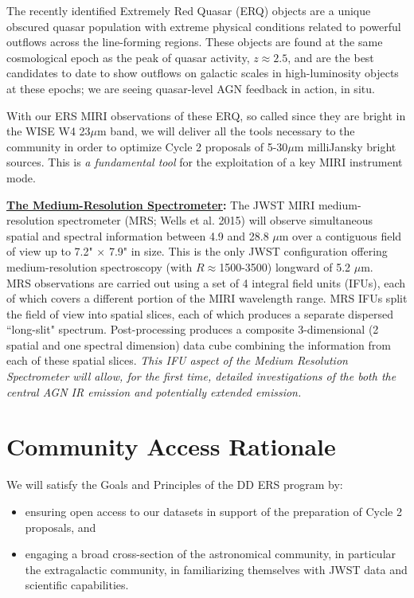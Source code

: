 \smallskip \smallskip
\noindent
The recently identified Extremely Red Quasar (ERQ) objects are a
unique obscured quasar population with extreme physical conditions
related to powerful outflows across the line-forming regions. These
objects are found at the same cosmological epoch as the peak of quasar
activity, $z\approx2.5$, and are the best candidates to date to show
outflows on galactic scales in high-luminosity objects at these epochs; 
we are seeing quasar-level AGN feedback in action, in situ.

\smallskip \smallskip
\noindent
With our ERS MIRI observations of these ERQ, so called since they are
bright in the WISE W4 23$\mu$m band, we will deliver all the tools
necessary to the community in order to optimize Cycle 2 proposals of
5-30$\mu$m milliJansky bright sources. This is {\it a fundamental
tool} for the exploitation of a key MIRI instrument mode.

\smallskip \smallskip
\noindent
{\bf \underline{The Medium-Resolution Spectrometer}:}
The JWST MIRI medium-resolution spectrometer (MRS; Wells et al. 2015)
will observe simultaneous spatial and spectral information between 4.9
and 28.8 $\mu$m over a contiguous field of view up to 7.2" × 7.9" in
size. This is the only JWST configuration offering medium-resolution
spectroscopy (with $R\approx$1500-3500) longward of 5.2 $\mu$m.\\ MRS
observations are carried out using a set of 4 integral field units
(IFUs), each of which covers a different portion of the MIRI
wavelength range. MRS IFUs split the field of view into spatial
slices, each of which produces a separate dispersed ``long-slit"
spectrum. Post-processing produces a composite 3-dimensional (2
spatial and one spectral dimension) data cube combining the
information from each of these spatial slices. {\it This IFU aspect of
the Medium Resolution Spectrometer will allow, for the first time,
detailed investigations of the both the central AGN IR emission and
potentially extended emission.}



\section*{Community Access Rationale}
\noindent
We will satisfy the Goals and Principles of the DD ERS program by:
\begin{itemize}
\item ensuring open access to our datasets in support of the preparation of Cycle 2 proposals, and
\item engaging a broad cross-section of the astronomical community, in particular the extragalactic community, in familiarizing themselves with JWST data and scientific capabilities.
\end{itemize}

